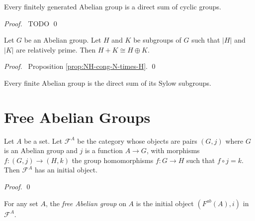 \begin{thm}
Every finitely generated Abelian group is a direct sum of cyclic groups.
\end{thm}

\begin{proof}
\pf\ TODO \qed
\end{proof}

\begin{prop}
Let $G$ be an Abelian group. Let $H$ and $K$ be subgroups of $G$ such that $|H|$ and $|K|$ are relatively prime. Then $H + K \cong H \oplus K$.
\end{prop}

\begin{proof}
\pf\ Proposition \ref{prop:NH-cong-N-times-H}. \qed
\end{proof}

\begin{cor}
Every finite Abelian group is the direct sum of its Sylow subgroups.
\end{cor}

\section{Free Abelian Groups}

\begin{prop}
    Let $A$ be a set. Let $\mathcal{F}^A$ be the category whose objects are pairs $(G,j)$ where $G$ is an Abelian group and $j$ is a function $A \rightarrow G$, with morphisms $f : (G,j) \rightarrow (H,k)$ the group homomorphisms $f : G \rightarrow H$ such that $f \circ j = k$. Then $\mathcal{F}^A$ has an initial object.
\end{prop}

\begin{proof}
    \pf
    \qed
\end{proof}

\begin{df}
    For any set $A$, the \emph{free Abelian group} on $A$ is the initial object $(F^{ab}(A),i)$ in $\mathcal{F}^A$.
\end{df}

